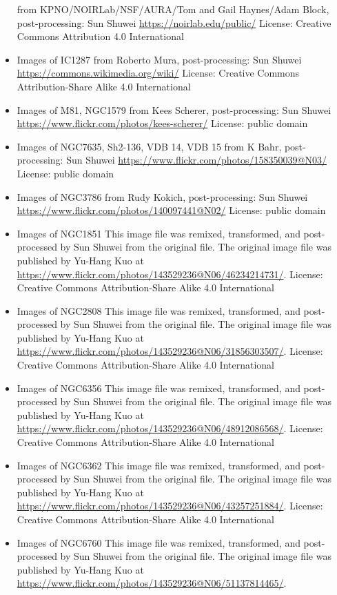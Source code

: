 \begin{itemize}
	 from KPNO/NOIRLab/NSF/AURA/Tom and Gail Haynes/Adam Block, post-processing: Sun Shuwei
	 \url{https://noirlab.edu/public/}
	 License: Creative Commons Attribution 4.0 International
\item Images of IC1287
	 from Roberto Mura, post-processing: Sun Shuwei
	 \url{https://commons.wikimedia.org/wiki/}
	 License: Creative Commons Attribution-Share Alike 4.0 International
\item Images of M81, NGC1579
	 from Kees Scherer, post-processing: Sun Shuwei
	 \url{https://www.flickr.com/photos/kees-scherer/}
	 License: public domain
\item Images of NGC7635, Sh2-136, VDB 14, VDB 15
	 from K Bahr, post-processing: Sun Shuwei
	 \url{https://www.flickr.com/photos/158350039@N03/}
	 License: public domain
\item Images of NGC3786
	 from Rudy Kokich, post-processing: Sun Shuwei
	 \url{https://www.flickr.com/photos/140097441@N02/}
	 License: public domain
\item Images of NGC1851
	 This image file was remixed, transformed, and post-processed by Sun Shuwei from the original file. The original image file was published by Yu-Hang Kuo at \url{https://www.flickr.com/photos/143529236@N06/46234214731/}.
	 License: Creative Commons Attribution-Share Alike 4.0 International
\item Images of NGC2808
	 This image file was remixed, transformed, and post-processed by Sun Shuwei from the original file. The original image file was published by Yu-Hang Kuo at \url{https://www.flickr.com/photos/143529236@N06/31856303507/}.
	 License: Creative Commons Attribution-Share Alike 4.0 International
\item Images of NGC6356
	 This image file was remixed, transformed, and post-processed by Sun Shuwei from the original file. The original image file was published by Yu-Hang Kuo at \url{https://www.flickr.com/photos/143529236@N06/48912086568/}.
	 License: Creative Commons Attribution-Share Alike 4.0 International
\item Images of NGC6362
	 This image file was remixed, transformed, and post-processed by Sun Shuwei from the original file. The original image file was published by Yu-Hang Kuo at \url{https://www.flickr.com/photos/143529236@N06/43257251884/}.
	 License: Creative Commons Attribution-Share Alike 4.0 International
\item Images of NGC6760
	 This image file was remixed, transformed, and post-processed by Sun Shuwei from the original file. The original image file was published by Yu-Hang Kuo at \url{https://www.flickr.com/photos/143529236@N06/51137814465/}.

\end{itemize}
